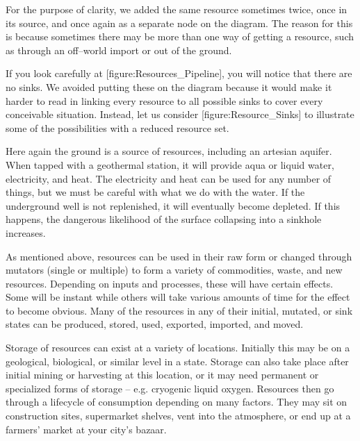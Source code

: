 For the purpose of clarity, we added the same resource sometimes twice, once in its source, and once again as a separate node on the diagram. The reason for this is because sometimes there may be more than one way of getting a resource, such as through an off--world import or out of the ground.

If you look carefully at [figure:Resources_Pipeline], you will notice that there are no sinks. We avoided putting these on the diagram because it would make it harder to read in linking every resource to all possible sinks to cover every conceivable situation. Instead, let us consider [figure:Resource_Sinks] to illustrate some of the possibilities with a reduced resource set.

    {}

Here again the ground is a source of resources, including an artesian aquifer. When tapped with a geothermal station, it will provide aqua or liquid water, electricity, and heat. The electricity and heat can be used for any number of things, but we must be careful with what we do with the water. If the underground well is not replenished, it will eventually become depleted. If this happens, the dangerous likelihood of the surface collapsing into a sinkhole increases.

As mentioned above, resources can be used in their raw form or changed through mutators (single or multiple) to form a variety of commodities, waste, and new resources. Depending on inputs and processes, these will have certain effects. Some will be instant while others will take various amounts of time for the effect to become obvious. Many of the resources in any of their initial, mutated, or sink states can be produced, stored, used, exported, imported, and moved.

Storage of resources can exist at a variety of locations. Initially this may be on a geological, biological, or similar level in a  state. Storage can also take place after initial mining or harvesting at this location, or it may need permanent or specialized forms of storage -- e.g. cryogenic liquid oxygen. Resources then go through a lifecycle of consumption depending on many factors. They may sit on construction sites, supermarket shelves, vent into the atmosphere, or end up at a farmers' market at your city's bazaar.

